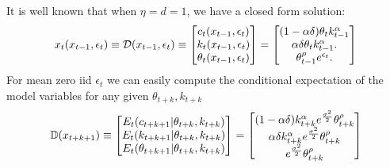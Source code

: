 \documentclass[12pt]{article}
\begin{document}
It is well known that when $\eta=d=1$, we have a closed form solution\citep{lettau03}:
\begin{gather}
x_t({x_{t-1},\epsilon_t})\equiv    \mathcal{D}({x_{t-1},\epsilon_t})\equiv
   \begin{bmatrix}
     c_t({x_{t-1},\epsilon_t})\\k_t({x_{t-1},\epsilon_t})\\ \theta_t({x_{t-1},\epsilon_t})
   \end{bmatrix}=
   \begin{bmatrix}
(1-\alpha \delta) \theta_{t} k_{t-1}^\alpha\\
  \alpha \delta \theta_{t} k_{t-1}^\alpha.\label{soln}\\
\theta_{t-1}^\rho e^{\epsilon_t}.
   \end{bmatrix}
\end{gather}
For mean zero iid $\epsilon_t$ we can easily 
compute the conditional expectation of the model variables for any given $\theta_{t+k},k_{t+k}$
\begin{gather*}
  \mathbb{D}(x_{t+k+1})\equiv
  \begin{bmatrix}
  E_t(c_{t+k+1}|\theta_{t+k},k_{t+k})\\
  E_t(k_{t+k+1}|\theta_{t+k},k_{t+k})\\
  E_t(\theta_{t+k+1}|\theta_{t+k},k_{t+k})
  \end{bmatrix}=
  \begin{bmatrix}
(1-\alpha\delta)k_{t+k}^\alpha e^{\frac{\sigma^2}{2}}\theta_{t+k}^\rho\\
\alpha\delta k_{t+k}^\alpha e^{\frac{\sigma^2}{2}}\theta_{t+k}^\rho\\
e^{\frac{\sigma^2}{2}}\theta_{t+k}^\rho
  \end{bmatrix}
\end{gather*}
\end{document}
